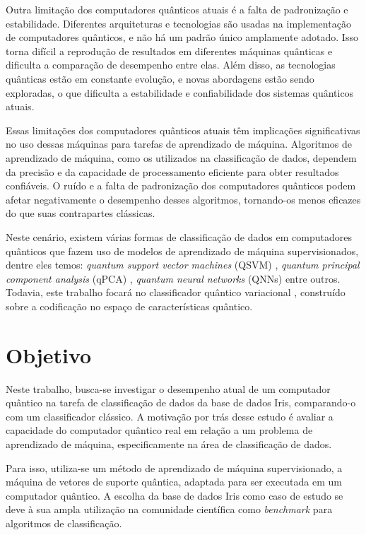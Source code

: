 Outra limitação dos computadores quânticos atuais é a falta de padronização e estabilidade. Diferentes arquiteturas e tecnologias são usadas na implementação de computadores quânticos, e não há um padrão único amplamente adotado. Isso torna difícil a reprodução de resultados em diferentes máquinas quânticas e dificulta a comparação de desempenho entre elas. Além disso, as tecnologias quânticas estão em constante evolução, e novas abordagens estão sendo exploradas, o que dificulta a estabilidade e confiabilidade dos sistemas quânticos atuais.

Essas limitações dos computadores quânticos atuais têm implicações significativas no uso dessas máquinas para tarefas de aprendizado de máquina. Algoritmos de aprendizado de máquina, como os utilizados na classificação de dados, dependem da precisão e da capacidade de processamento eficiente para obter resultados confiáveis. O ruído e a falta de padronização dos computadores quânticos podem afetar negativamente o desempenho desses algoritmos, tornando-os menos eficazes do que suas contrapartes clássicas.

Neste cenário, existem várias formas de classificação de dados em computadores quânticos que fazem uso de modelos de aprendizado de máquina supervisionados, dentre eles temos: \textit{quantum support vector machines} (QSVM) \cite{Rebentrost2014QSVM}, \textit{quantum principal component analysis} (qPCA) \cite{Lloyd2014qPCA}, \textit{quantum neural networks} (QNNs) \cite{Abhijith2022QuantumAlgorithm} entre outros. Todavia, este trabalho focará no classificador quântico variacional \cite{Havlicek2019qSupervisedLearning}, construído sobre a codificação no espaço de características quântico.

\section{Objetivo} \label{sec1}

Neste trabalho, busca-se investigar o desempenho atual de um computador quântico na tarefa de classificação de dados da base de dados Iris, comparando-o com um classificador clássico. A motivação por trás desse estudo é avaliar a capacidade do computador quântico real em relação a um problema de aprendizado de máquina, especificamente na área de classificação de dados.

Para isso, utiliza-se um método de aprendizado de máquina supervisionado, a máquina de vetores de suporte quântica, adaptada para ser executada em um computador quântico. A escolha da base de dados Iris como caso de estudo se deve à sua ampla utilização na comunidade científica como \textit{benchmark} para algoritmos de classificação.

